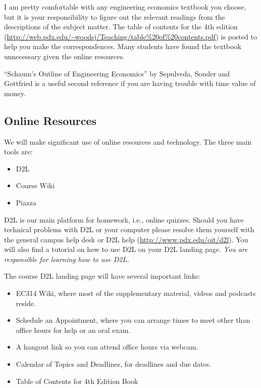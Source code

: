 \documentclass[letterpaper,10pt]{article}
\begin{document}
I am pretty comfortable with any engineering
economics textbook you choose, but it is your responsibility to figure
out the relevant readings from the descriptions of the subject matter.
The table of contents for the 4th edition (\url{http://web.pdx.edu/~woodsj/Teaching/table\%20of\%20contents.pdf}) is posted to help you
make the correspondences.  Many students have found the textbook unnecessary given the online resources.

``Schaum's Outline of Engineering Economics'' by Sepulveda, Souder and Gottfried is a useful second reference if you are having trouble with time value of money.

\subsection{Online Resources}
We will make significant use of online resources and technology.  The
three main tools are:
\begin{itemize}
\item D2L
\item Course Wiki
\item Piazza
\end{itemize}

D2L is our main platform for homework, i.e., online quizzes.  Should you have technical problems with D2L
or your computer please resolve them yourself with the general campus
help desk or D2L help (\url{http://www.pdx.edu/oit/d2l}).  You will
also find a tutorial on how to use D2L on your D2L landing page.
\emph{You are responsible for learning how to use D2L.}


The course D2L landing page will have several important links:
\begin{itemize}
\item EC314 Wiki, where most of the supplementary material, videos and
  podcasts reside.
\item Schedule an Appointment, where you can arrange times to meet
  other than office hours for help or an oral exam.
  
  \item A hangout link so you can attend office hours via webcam.
  
\item Calendar of Topics and Deadlines, for deadlines and due dates.
\item Table of Contents for 4th Edition Book
\end{itemize}
\end{document}
